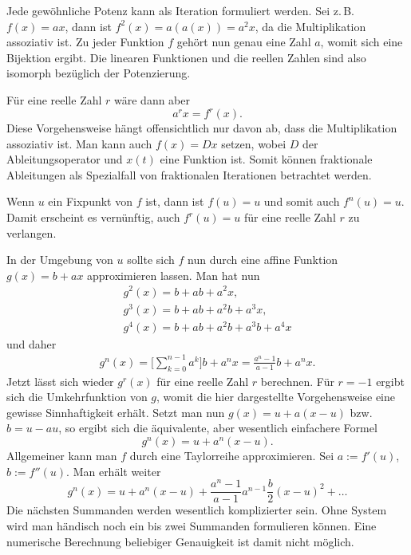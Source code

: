 \documentclass[a4paper,10pt,fleqn,twocolumn,twoside]{article}
\begin{document}
Jede gewöhnliche Potenz kann als Iteration formuliert werden.
Sei z.\,B. $f(x)=ax$, dann ist $f^2(x)=a(a(x))=a^2 x$, da die
Multiplikation assoziativ ist. Zu jeder Funktion $f$ gehört nun
genau eine Zahl $a$, womit sich eine Bijektion ergibt. Die
linearen Funktionen und die reellen Zahlen sind also isomorph
bezüglich der {\glqq}Potenzierung{\grqq}.

Für eine reelle Zahl $r$ wäre dann aber
\[a^r x = f^r(x).\]
Diese Vorgehensweise hängt offensichtlich nur davon ab, dass
die Multiplikation assoziativ ist. Man kann auch $f(x)=Dx$ setzen,
wobei $D$ der Ableitungsoperator und $x(t)$ eine Funktion ist.
Somit können fraktionale Ableitungen als Spezialfall von
fraktionalen Iterationen betrachtet werden.

Wenn $u$ ein Fixpunkt von $f$ ist, dann ist $f(u)=u$ und
somit auch $f^n(u)=u$. Damit erscheint es vernünftig, auch
$f^r(u)=u$ für eine reelle Zahl $r$ zu verlangen.

In der Umgebung von $u$ sollte sich $f$ nun durch eine
affine Funktion $g(x)=b+ax$ approximieren lassen. Man hat
nun
\begin{gather*}
g^2(x) = b+ab+a^2x,\\
g^3(x) = b+ab+a^2b+a^3x,\\
g^4(x) = b+ab+a^2b+a^3b+a^4x
\end{gather*}
und daher
\begin{gather*}
g^n(x) = \bigg[\sum_{k=0}^{n-1}a^k\bigg]b+a^nx
= \frac{a^n-1}{a-1}b+a^nx.
\end{gather*}
Jetzt lässt sich wieder $g^r(x)$ für eine reelle Zahl $r$
berechnen. Für $r=-1$ ergibt sich die Umkehrfunktion von $g$,
womit die hier dargestellte Vorgehensweise eine gewisse Sinnhaftigkeit
erhält. Setzt man nun $g(x)=u+a(x-u)$ bzw. $b=u-au$, so ergibt
sich die äquivalente, aber wesentlich einfachere Formel
\[g^n(x) = u+a^n(x-u).\]
Allgemeiner kann man $f$ durch eine Taylorreihe approximieren.
Sei $a:=f'(u)$, $b:=f''(u)$. Man erhält weiter
\[g^n(x) = u+a^n(x-u)
+\frac{a^n-1}{a-1}a^{n-1}\frac{b}{2}(x-u)^2+\ldots\]
Die nächsten Summanden werden wesentlich komplizierter sein. Ohne
System wird man händisch noch ein bis zwei Summanden formulieren
können. Eine numerische Berechnung beliebiger Genauigkeit ist damit
nicht möglich.
\end{document}
